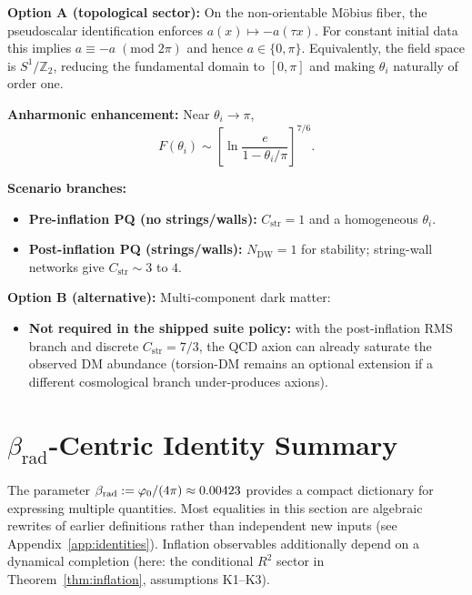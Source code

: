 \begin{tcolorbox}[colback=yellow!5, colframe=yellow!60!black, 
    title={\textbf{Resolution: Topologically Preferred $\theta_i$}}, fonttitle=\bfseries\small]
\textbf{Option A (topological sector):} On the non-orientable M\"obius fiber, the pseudoscalar
identification enforces $a(x)\mapsto -a(\tau x)$. For constant initial data this implies
$a \equiv -a \;(\mathrm{mod}\;2\pi)$ and hence $a \in \{0,\pi\}$. Equivalently, the field space
is $S^1/\mathbb{Z}_2$, reducing the fundamental domain to $[0,\pi]$ and making $\theta_i$
naturally of order one.

\textbf{Anharmonic enhancement:} Near $\theta_i \to \pi$,
\begin{equation}
    F(\theta_i) \sim \left[\ln\frac{e}{1 - \theta_i/\pi}\right]^{7/6}.
\end{equation}

\textbf{Scenario branches:}
\begin{itemize}[leftmargin=1.5em, topsep=2pt, itemsep=1pt]
    \item \textbf{Pre-inflation PQ (no strings/walls):} $C_{\mathrm{str}}=1$ and a homogeneous $\theta_i$.
    \item \textbf{Post-inflation PQ (strings/walls):} $N_{\mathrm{DW}}=1$ for stability; string-wall networks give $C_{\mathrm{str}}\sim 3$ to $4$.
\end{itemize}

\textbf{Option B (alternative):} Multi-component dark matter:
\begin{itemize}[leftmargin=1.5em, topsep=2pt, itemsep=1pt]
    \item \textbf{Not required in the shipped suite policy:} with the post-inflation RMS branch and discrete $C_{\mathrm{str}}=7/3$, the QCD axion can already saturate the observed DM abundance (torsion-DM remains an optional extension if a different cosmological branch under-produces axions).
\end{itemize}
\end{tcolorbox}

\section{$\beta_{\text{rad}}$-Centric Identity Summary}

The parameter $\beta_{\text{rad}} := \varphi_0/(4\pi) \approx 0.00423$ provides a compact dictionary for expressing multiple quantities. 
Most equalities in this section are algebraic rewrites of earlier definitions rather than independent new inputs (see Appendix~\ref{app:identities}). 
Inflation observables additionally depend on a dynamical completion (here: the conditional $R^2$ sector in Theorem~\ref{thm:inflation}, assumptions K1--K3).

